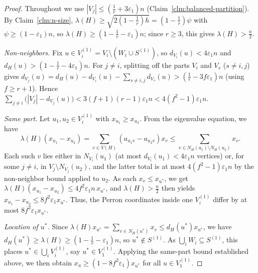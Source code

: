 \documentclass[10pt,a4paper]{amsart}
\newcommand{\eps}{\varepsilon}
\renewcommand{\ge}{\geqslant}
\renewcommand{\le}{\leqslant}
\begin{document}
\begin{proof}
Throughout we use $|V_j|\le(\tfrac1r+3\eps_1)n$
(Claim~\ref{clm:balanced-partition}). By Claim~\ref{clm:n-size},
$\lambda(H)\ge\sqrt{2(1-\tfrac1r)h}=(1-\tfrac1r)\psi$ with
$\psi\ge(1-\eps_1)n$, so
$\lambda(H)\ge(1-\tfrac1r-\eps_1)n$; since $r\ge3$, this
gives $\lambda(H)>\tfrac n2$.

\emph{Non-neighbors.} Fix
$u\in V_i^{(1)}=V_i\setminus(W_i\cup S^{(1)})$, so
$d_{V_i}(u)<4\eps_1n$ and $d_H(u)>(1-\tfrac1r-4\eps_1)n$.
For $j\ne i$, splitting off the parts $V_i$ and $V_s$
($s\ne i,j$) gives
$d_{V_j}(u)=d_H(u)-d_{V_i}(u)-\sum_{s\ne i,j}d_{V_s}(u)
>(\tfrac1r-3f\eps_1)n$ (using $f\ge r+1$). 
Hence
$
  \sum_{j\ne i}\bigl(|V_j|-d_{V_j}(u)\bigr)
  <3(f+1)(r-1)\eps_1n<4(f^2-1)\eps_1n$.

\emph{Same part.} Let $u_1,u_2\in V_i^{(1)}$ with
$x_{u_1}\ge x_{u_2}$. From the eigenvalue equation, we have 
$$\lambda(H)(x_{u_1}-x_{u_2})
=\sum_{v\in V(H)}(a_{u_1v}-a_{u_2v})x_v
\le\sum_{v\in N_H(u_1)\setminus N_H(u_2)}x_v.$$
Each such $v$ lies either in $N_{V_i}(u_1)$ (at most
$d_{V_i}(u_1)<4\eps_1n$ vertices) or, for some $j\ne i$, in
$V_j\setminus N_{V_j}(u_2)$, and the latter total is at
most $4(f^2-1)\eps_1n$ by the non-neighbor bound applied to
$u_2$. As each $x_v\le x_{u^\ast}$, we get
$\lambda(H)(x_{u_1}-x_{u_2})\le4f^2\eps_1n\,x_{u^\ast}$, and
$\lambda(H)>\tfrac n2$ then yields
$x_{u_1}-x_{u_2}\le8f^2\eps_1x_{u^\ast}$. Thus, the Perron
coordinates inside one $V_i^{(1)}$ differ by at most
$8f^2\eps_1x_{u^\ast}$.

\emph{Location of $u^\ast$.} Since
$\lambda(H)x_{u^\ast}=\sum_{v\in N_H(u^\ast)}x_v
\le d_H(u^\ast)x_{u^\ast}$, we have
$d_H(u^\ast)\ge\lambda(H)\ge(1-\tfrac1r-\eps_1)n$, so
$u^\ast\notin S^{(1)}$. As $\bigcup_iW_i\subseteq S^{(1)}$,
this places $u^\ast\in\bigcup_iV_i^{(1)}$, say
$u^\ast\in V_1^{(1)}$. 
Applying the same-part bound established above,  
we then obtain 
$x_u\ge(1-8f^2\eps_1)x_{u^\ast}$ for all $u\in V_1^{(1)}$.


\end{proof}
\end{document}
